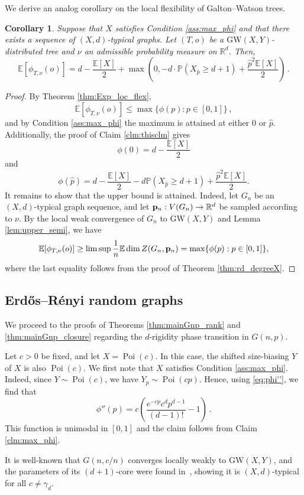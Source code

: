 \documentclass[reqno,english]{amsart}
\numberwithin{equation}{section}
\newtheorem{corollary}[theorem]{Corollary}
\theoremstyle{definition}{
\newtheorem{example}[theorem]{Example}
\newtheorem{definition}[theorem]{Definition}
\newtheorem*{definition*}{Definition}
\newtheorem{problem}[theorem]{Problem}
\newtheorem{question}[theorem]{Question}
}
\newcommand{\E}{\mathbb E}
\renewcommand{\P}{\mathbb P}
\newcommand{\R}{\mathbb R}
\newcommand{\p}{{\bf p}}
\begin{document}
We derive an analog corollary on the local flexibility of Galton--Watson trees.

\begin{corollary}\label{cor:treeX}
    Suppose that $X$ satisfies Condition \ref{ass:max_phi} and that there exists a sequence of $(X,d)$-typical graphs. Let $(T,o)$ be a $\mathrm{GW}(X,Y)$-distributed tree and $\nu$ an admissible probability measure on $\R^d$. Then,
    \[
    \E[\phi_{T,\nu}(o)] = d - \frac{\E[X]}{2} + \max\left(0,-d\cdot\P(X_{\hat p}\ge d+1)+\frac{\hat p^2\E[X]}{2}\right)\,.
    \]
\end{corollary}
\begin{proof}
By Theorem \ref{thm:Exp_loc_flex},
\[
    \E[\phi_{T,\nu}(o)]\le \max\{\phi(p):p\in[0,1]\}\,,
\]
and by Condition \ref{ass:max_phi} the maximum is attained at either \(0\) or
\(\hat p\). Additionally, the proof of Claim \ref{clm:thisclm} gives
\[
    \phi(0)=d-\frac{\E[X]}2
\]
and
\[
    \phi(\hat p)
    =
    d-\frac{\E[X]}2
    -d\P(X_{\hat p}\ge d+1)
    +\frac{\hat p^2\E[X]}2 .
\]
It remains to show that the upper bound is attained. Indeed, let
$G_n$ be an $(X,d)$-typical graph sequence, and let $\p_n:V(G_n)\to\R^d$ be sampled according to
$\nu$. By the local weak convergence of \(G_n\) to \(\mathrm{GW}(X,Y)\)
and Lemma \ref{lem:upper_semi}, we have
\[
    \E[\phi_{T,\nu}(o)]\ge \limsup \frac{1}{n}\E\dim Z(G_n,\p_n)=
    \max\{\phi(p):p\in[0,1]\},
\]
where the last equality follows from the proof of Theorem
\ref{thm:rd_degreeX}.
\end{proof}

\subsection{Erd\H{o}s--R\'enyi random graphs}
\label{sec:ER}
We proceed to the proofs of Theorems \ref{thm:mainGnp_rank} and \ref{thm:mainGnp_closure} regarding the $d$-rigidity phase
transition in $G(n,p)$. 

Let $c>0$ be fixed, and let $X= \operatorname{Poi}(c)$. In this case, the shifted size-biasing
$Y$ of $X$ is also $\operatorname{Poi}(c)$. We first note that \(X\) satisfies Condition \ref{ass:max_phi}. Indeed, since \(Y\sim \operatorname{Poi}(c)\), we have
\(Y_p\sim \operatorname{Poi}(cp)\). Hence, using \eqref{eq:phi''}, we find that
\[
\phi''(p)=c\left(\frac{e^{-cp}c^dp^{d-1}}{(d-1)!}-1 \right)\,.
\]
This function is unimodal in $[0,1]$ and the claim follows from Claim \ref{clm:max_phi}.

It is well-known that \(G(n,c/n)\) converges locally weakly to $\mathrm{GW}(X,Y)$, and the parameters of its $(d+1)$-core were found in~\cite{PittelSpencerWormaldCore}, showing it is $(X,d)$-typical for all $c\ne \gamma_d$.
\end{document}
